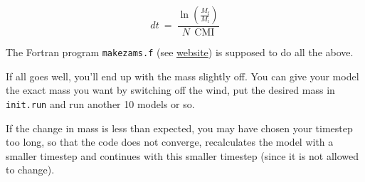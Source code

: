 \vspace{1cm}

\[
dt~=~\frac{\ln\left(\frac{M_\mathrm{f}}{M_\mathrm{i}}\right)}{N ~~ \mathrm{CMI}}
\]

\vspace{1cm}

The Fortran program \texttt{makezams.f} (see \href{http://www.astro.uu.nl/~sluys/Eggleton/#tools}{website}) is supposed to do all the above.

\vspace{1cm}

If all goes well, you'll end up with the mass slightly off.  You can give your model the exact mass you want
by switching off the wind, put the desired mass in \texttt{init.run} and run another 10 models or so.

If the change in mass is less than expected, you may have chosen your timestep too long, so that the code does
not converge, recalculates the model with a smaller timestep and continues with this smaller timestep 
(since it is not allowed to change).

